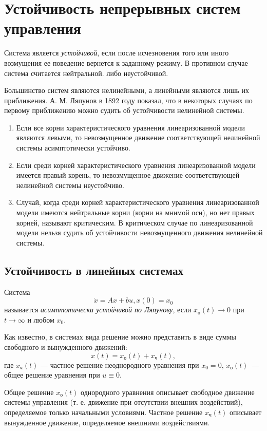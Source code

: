 \documentclass[../../TAU.tex]{subfiles}
\begin{document}
\chapter{Устойчивость непрерывных систем управления}

     Система является {\it устойчивой}, если после исчезновения того или иного возмущения ее поведение вернется к заданному режиму. В противном случае система считается нейтральной. либо неустойчивой. \par
    Большинство систем являются нелинейными, а линейными являются лишь их приближения. А. М. Ляпунов в 1892 году показал, что в некоторых случаях по первому приближению можно судить об устойчивости нелинейной системы.

    \begin{enumerate}
        \item Если все корни характеристического уравнения линеаризованной модели являются левыми, то невозмущенное движение соответствующей нелинейной системы асимптотически устойчиво.
        \item Если среди корней характеристического уравнения линеаризованной модели имеется правый корень, то невозмущенное движение соответствующей нелинейной системы неустойчиво.
        \item Случай, когда среди корней характеристического уравнения линеаризованной модели имеются нейтральные корни (корни на мнимой оси), но нет правых корней, называют критическим. В критическом случае по линеаризованной модели нельзя судить об устойчивости невозмущенного движения нелинейной системы. 

    \end{enumerate}

\section{Устойчивость в линейных системах}

    Система 
    \begin{equation}\label{LIN_DS_3_1}
        \dot x = Ax + bu, x(0) = x_0
    \end{equation} 
    называется 
    {\it асимптотически устойчивой по Ляпунову}, если 
    $x_\text{о}(t)\rightarrow0$ 
    при 
    $t\rightarrow\infty$ 
    и любом $x_0$.\par
    Как известно, в системах вида
    решение можно представить в виде суммы свободного и вынужденного движений:
    $$
        x(t) = x_\text{о}(t) + x_\text{ч}(t),
    $$
    где $x_\text{ч}(t)$ --- частное решение неоднородного уравнения при 
    $x_0 = 0$, $x_\text{о}(t)$~--- общее решение уравнения при 
    $u\equiv0$.
    \par
    Общее решение $x_\text{о}(t)$ однородного уравнения описывает свободное движение системы управления (т. е. движение при отсутствии внешних воздействий), определяемое только начальными условиями. Частное решение $x_\text{ч}(t)$ описывает вынужденное движение, определяемое внешними воздействиями.
\end{document}
